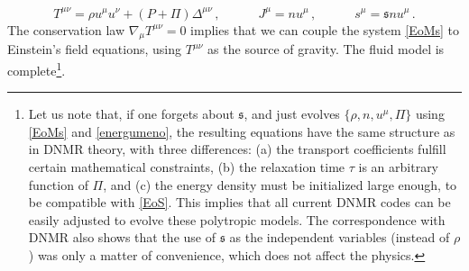 \documentclass[a4paper, amsfonts, amssymb, amsmath, reprint, showkeys, nofootinbib, twoside,notitlepage,onecolumn]{revtex4-2}
\newcommand{\spc}{\quad \quad \quad}
\newcommand{\s}{{\mathfrak{s}}}
\theoremstyle{definition}
\theoremstyle{theorem}
\theoremstyle{corollary}
\begin{document}
\begin{equation}\label{TheFluxioni}
T^{\mu \nu}= \rho u^\mu u^\nu +(P{+}\Pi)\Delta^{\mu \nu} \, , \spc
J^\mu = n u^\mu \, , \spc
s^\mu = \s n u^\mu \, . 
\end{equation}
The conservation law $\nabla_\mu T^{\mu \nu}=0$ implies that we can couple the system \eqref{EoMs} to Einstein's field equations, using $T^{\mu \nu}$ as the source of gravity. The fluid model is complete\footnote{Let us note that, if one forgets about $\s$, and just evolves $\{\rho,n,u^\mu,\Pi\}$ using \eqref{EoMs} and \eqref{energumeno}, the resulting equations have the same structure as in DNMR theory, with three differences: (a) the transport coefficients fulfill certain mathematical constraints, (b) the relaxation time $\tau$ is an arbitrary function of $\Pi$, and (c) the energy density must be initialized large enough, to be compatible with \eqref{EoS}. This implies that all current DNMR codes can be easily adjusted to evolve these polytropic models. The correspondence with DNMR also shows that the use of $\s$ as the independent variables (instead of $\rho$) was only a matter of convenience, which does not affect the physics.}.



\end{document}
